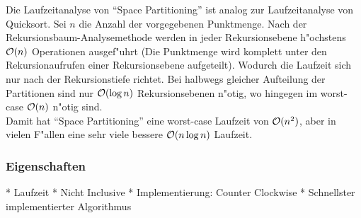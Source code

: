 Die Laufzeitanalyse von ``Space Partitioning'' ist analog zur Laufzeitanalyse
von Quicksort. Sei $n$ die Anzahl der vorgegebenen Punktmenge.
Nach der Rekursionsbaum-Analysemethode werden in jeder Rekursionsebene 
h"ochstens $\mathcal{O}(n)$ Operationen ausgef"uhrt (Die Punktmenge wird komplett
unter den Rekursionaufrufen einer Rekursionsebene aufgeteilt).
Wodurch die Laufzeit sich nur nach der Rekursionstiefe richtet.
Bei halbwegs gleicher Aufteilung der Partitionen sind nur $\mathcal{O}(\log n)$
Rekursionsebenen n"otig, wo hingegen im worst-case $\mathcal{O}(n)$ n"otig sind. \\
Damit hat ``Space Partitioning'' eine worst-case Laufzeit von
$\mathcal{O}(n^2)$, aber in vielen F"allen eine sehr viele bessere $\mathcal{O}(n \log n)$
Laufzeit.

\subsubsection{Eigenschaften}

* Laufzeit
* Nicht Inclusive
* Implementierung: Counter Clockwise
* Schnellster implementierter Algorithmus
